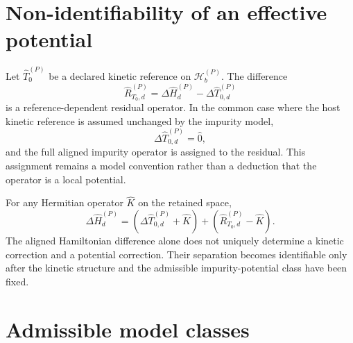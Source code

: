 \section{Non-identifiability of an effective potential}


Let $\hat T_0^{(P)}$ be a declared kinetic reference on
$\mathcal H_b^{(P)}$. The difference
\begin{equation}
    \hat R_{T_0,d}^{(P)}
    =
    \Delta\hat H_d^{(P)}
    -
    \Delta\hat T_{0,d}^{(P)}
\end{equation}
is a reference-dependent residual operator. In the common case where the host
kinetic reference is assumed unchanged by the impurity model,
\begin{equation}
    \Delta\hat T_{0,d}^{(P)}=\hat 0,
\end{equation}
and the full aligned impurity operator is assigned to the residual. This
assignment remains a model convention rather than a deduction that the
operator is a local potential.

For any Hermitian operator $\hat K$ on the retained space,
\begin{equation}
    \Delta\hat H_d^{(P)}
    =
    \left(
        \Delta\hat T_{0,d}^{(P)}+\hat K
    \right)
    +
    \left(
        \hat R_{T_0,d}^{(P)}-\hat K
    \right).
\end{equation}
The aligned Hamiltonian difference alone does not uniquely determine a kinetic
correction and a potential correction. Their separation becomes identifiable
only after the kinetic structure and the admissible impurity-potential class
have been fixed.

\section{Admissible model classes}


